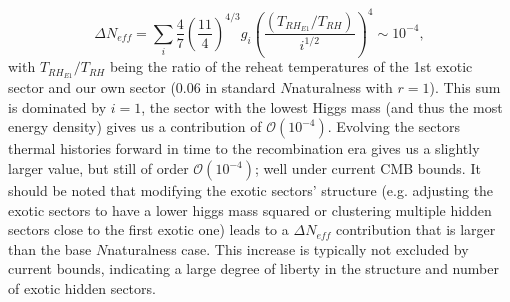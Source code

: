 \documentclass[nofootinbib,twocolumn,preprintnumbers]{revtex4-1}
\begin{document}
\begin{equation}
\Delta N_{eff} = \sum_i \frac{4}{7}\left(\frac{11}{4}\right)^{4/3}g_{i} \left(\frac{(T_{RH_{E1}}/T_{RH})}{i^{1/2}}\right)^4 \sim 10^{-4},
\end{equation}     
with $T_{RH_{E1}}/T_{RH}$ being the ratio of the reheat temperatures of the 1st exotic sector and our own sector ($0.06$ in standard $N$naturalness with $r = 1$).  This sum is dominated by $i=1$, the sector with the lowest Higgs mass (and thus the most energy density) gives us a contribution of $\mathcal{O} (10^{-4})$. Evolving the sectors thermal histories forward in time to the recombination era gives us a slightly larger value, but still of order $\mathcal{O}(10^{-4})$; well under current CMB bounds. 
It should be noted that modifying the exotic sectors' structure (e.g. adjusting the exotic sectors to have a lower higgs mass squared or clustering multiple hidden sectors close to the first exotic one) leads to a $\Delta N_{eff}$ contribution that is larger than the base $N$naturalness case. This increase is typically not excluded by current bounds, indicating a large degree of liberty in the structure and number of exotic hidden sectors.
\end{document}
